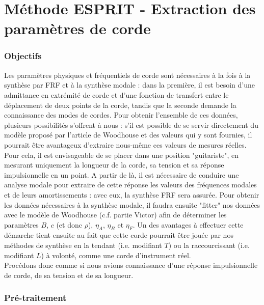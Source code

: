 \chapter{Méthode ESPRIT - Extraction des paramètres de corde}

\subsection{Objectifs}

Les paramètres physiques et fréquentiels de corde sont nécessaires à la fois à
la synthèse par FRF et à la synthèse modale : dans la première, il est besoin
d'une admittance en extrémité de corde et d'une fonction de transfert entre le
déplacement de deux points de la corde, tandis que la seconde demande la
connaissance des modes de cordes. Pour obtenir l'ensemble de ces données,
plusieurs possibilités s'offrent à nous : s'il est possible de se servir
directement du modèle proposé par l'article de Woodhouse et des valeurs qui y
sont fournies, il pourrait être avantageux d'extraire nous-même ces valeurs de
mesures réelles.\\ Pour cela, il est envisageable de se placer dans une
position "guitariste", en mesurant uniquement la longueur de la corde, sa
tension et sa réponse impulsionnelle en un point. A partir de là, il est
nécessaire de conduire une analyse modale pour extraire de cette réponse les
valeurs des fréquences modales et de leurs amortissements : avec eux, la
synthèse FRF sera assurée. Pour obtenir les données nécessaires à la synthèse
modale, il faudra ensuite "fitter" nos données avec le modèle de Woodhouse
(c.f. partie Victor) afin de déterminer les paramètres $B$, $c$ (et donc
$\rho$), $\eta_A$, $\eta_B$ et $\eta_F$. Un des avantages à effectuer cette
démarche tient ensuite au fait que cette corde pourrait être jouée par nos
méthodes de synthèse en la tendant (i.e. modifiant $T$) ou la raccourcissant
(i.e. modifiant $L$) à volonté, comme une corde d'instrument réel.\\ Procédons
donc comme si nous avions connaissance d'une réponse impulsionnelle de corde,
de sa tension et de sa longueur.

\subsection{Pré-traitement}


